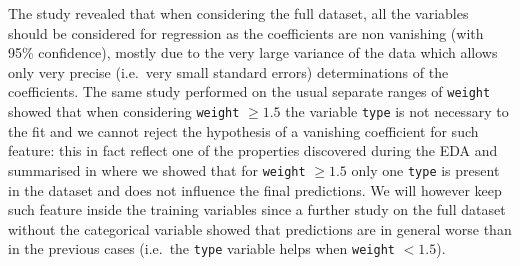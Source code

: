 The study revealed that when considering the full dataset, all the variables
should be considered for regression as the coefficients are non vanishing (with
95\% confidence), mostly due to the very large variance of the data which
allows only very precise (i.e.\ very small standard errors) determinations of
the coefficients.
The same study performed on the usual separate ranges of \texttt{weight} showed
that when considering \texttt{weight} $\ge 1.5$ the variable \texttt{type} is
not necessary to the fit and we cannot reject the hypothesis of a vanishing
coefficient for such feature: this in fact reflect one of the properties
discovered during the EDA and summarised in  where we
showed that for \texttt{weight} $\ge 1.5$ only one \texttt{type} is present in
the dataset and does not influence the final predictions.
We will however keep such feature inside the training variables since a further
study on the full dataset without the categorical variable showed that
predictions are in general worse than in the previous cases (i.e.\ the
\texttt{type} variable helps when \texttt{weight} $< 1.5$).
